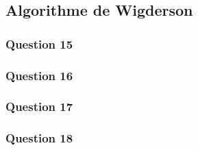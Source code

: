 \subsection*{Algorithme de Wigderson}
\subsubsection*{Question 15}

\subsubsection*{Question 16}

\subsubsection*{Question 17}

\subsubsection*{Question 18}
